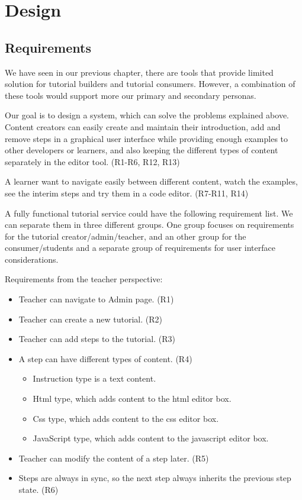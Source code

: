 \documentclass[11pt, a4paper, oneside, openright, medskipamount]{report}
\begin{document}
\chapter{Design}

\section{Requirements}

We have seen in our previous chapter, there are tools that provide limited solution for tutorial builders and tutorial consumers. However, a combination of these tools would support more our primary and secondary personas.

Our goal is to design a system, which can solve the problems explained above. Content creators can easily create and maintain their introduction, add and remove steps in a graphical user interface while providing enough examples to other developers or learners, and also keeping the different types of content separately in the editor tool. (R1-R6, R12, R13)

A learner want to navigate easily between different content, watch the examples, see the interim steps and try them in a code editor. (R7-R11, R14)

A fully functional tutorial service could have the following requirement list. We can separate them in three different groups. One group focuses on requirements for the tutorial creator/admin/teacher, and an other group for the consumer/students and a separate group of requirements for user interface considerations.

\noindent Requirements from the teacher perspective:
\begin{itemize}[noitemsep]
\item Teacher can navigate to Admin page. (R1)
\item Teacher can create a new tutorial. (R2)
\item Teacher can add steps to the tutorial. (R3)
\item A step can have different types of content. (R4)
\begin{itemize}[noitemsep]
\item Instruction type is a text content.
\item Html type, which adds content to the html editor box.
\item Css type, which adds content to the css editor box.
\item JavaScript type, which adds content to the javascript editor box.
\end{itemize}
\item Teacher can modify the content of a step later. (R5)
\item Steps are always in sync, so the next step always inherits the previous step state. (R6)
\end{itemize}
\end{document}
